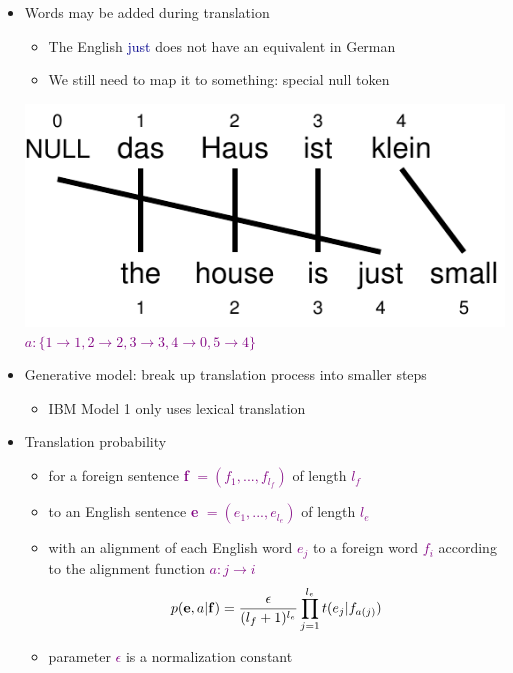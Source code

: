\documentclass[landscape]{slides}
\newcommand{\example}[1]{\textcolor{darkblue}{\rm #1}}
\newcommand{\maths}[1]{\textcolor{purple}{#1}}
\begin{document}
\begin{itemize}
\item Words may be added during translation
\begin{itemize}
\item The English \example{just} does not have an equivalent in German
\item We still need to map it to something: special {\sc null} token
\end{itemize}
\begin{center}
\includegraphics[scale=1.5]{haus-ist-klein-alignment-nullgen.pdf}\\[10mm]
\maths{$a: \{ 1 \rightarrow 1, 2 \rightarrow 2, 3 \rightarrow 3, 4 \rightarrow 0, 5 \rightarrow 4 \} $}
\end{center}
\end{itemize}


\begin{itemize}
\item Generative model: break up translation process into smaller steps
\begin{itemize} \vspace{-3mm}
\item IBM Model 1 only uses lexical translation
\end{itemize} 
\item Translation probability 
\begin{itemize} \vspace{-3mm}
\item for a foreign sentence \maths{{\bf f} $= (f_1, ..., f_{l_f})$} of length  \maths{$l_f$}
\item to an English sentence  \maths{{\bf e} $= (e_1, ..., e_{l_e})$} of length  \maths{$l_e$} 
\item with an alignment of each English word  \maths{$e_j$} to a foreign word  \maths{$f_i$} according to the alignment function  \maths{$a: j \rightarrow i$}
 \maths{\begin{equation*}
p({\bf e},a|{\bf f}) = 
\frac{\epsilon}{(l_f+1)^{l_e}} \prod_{j=1}^{l_e} t(e_j|f_{a(j)})
\end{equation*}}
\item parameter  \maths{$\epsilon$} is a normalization constant
\end{itemize}
\end{itemize}
\end{document}
